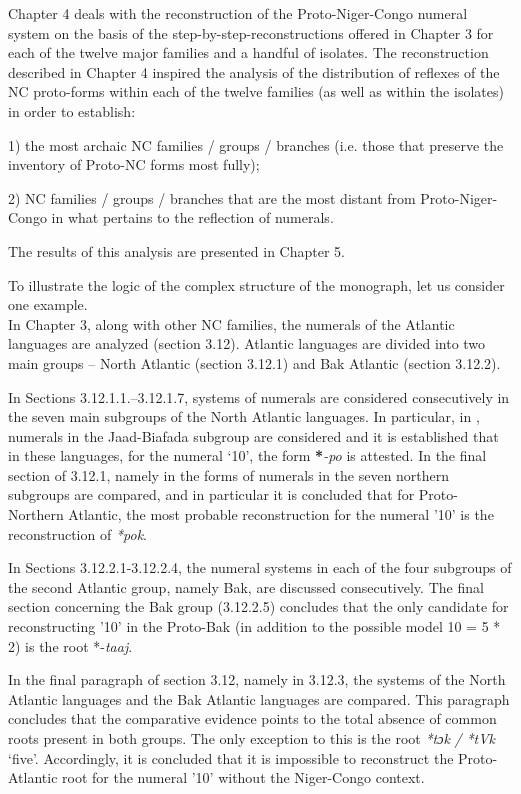 Chapter 4 deals with the reconstruction of the Proto-Niger-Congo numeral system on the basis of the step-by-step-reconstructions offered in Chapter 3 for each of the twelve major families and a handful of isolates.  
The reconstruction described in Chapter 4 inspired the analysis of the distribution of reflexes of the NC proto-forms within each of the twelve families (as well as within the isolates) in order to establish:

1) the most archaic NC families / groups / branches (i.e. those that preserve the inventory of Proto-NC forms most fully); 

2) NC families / groups / branches that are the most distant from Proto-Niger-Congo in what pertains to the reflection of numerals. 

The results of this analysis are presented in Chapter 5.

To illustrate the logic of the complex structure of the monograph, let us consider one example.\\

In Chapter 3, along with other NC families, the numerals of the Atlantic languages are analyzed (section 3.12). Atlantic languages are divided into two main groups – North Atlantic (section 3.12.1) and Bak Atlantic (section 3.12.2).

In Sections 3.12.1.1.–3.12.1.7, systems of numerals are considered consecutively in the seven main subgroups of the North Atlantic languages. In particular, in , numerals in the Jaad-Biafada subgroup are considered and it is established that in these languages, for the numeral ‘10', the form \textbf{*}\textit{{}-po} is attested. In the final section of 3.12.1, namely in  the forms of numerals in the seven northern subgroups are compared, and in particular it is concluded that for Proto-Northern Atlantic, the most probable reconstruction for the numeral '10' is the reconstruction of \textit{*pok}.

In Sections 3.12.2.1-3.12.2.4, the numeral systems in each of the four subgroups of the second Atlantic group, namely Bak, are discussed consecutively. The final section concerning the Bak group (3.12.2.5) concludes that the only candidate for reconstructing '10' in the Proto-Bak (in addition to the possible model 10 = 5 * 2) is the root *-\textit{taaj}.

In the final paragraph of section 3.12, namely in 3.12.3, the systems of the North Atlantic languages and the Bak Atlantic languages are compared. This paragraph concludes that the comparative evidence points to the total absence of common roots present in both groups. The only exception to this is the root \textit{*tɔk} \textit{/} \textit{*tVk} ‘five'. Accordingly, it is concluded that it is impossible to reconstruct the Proto-Atlantic root for the numeral '10' without the Niger-Congo context.

